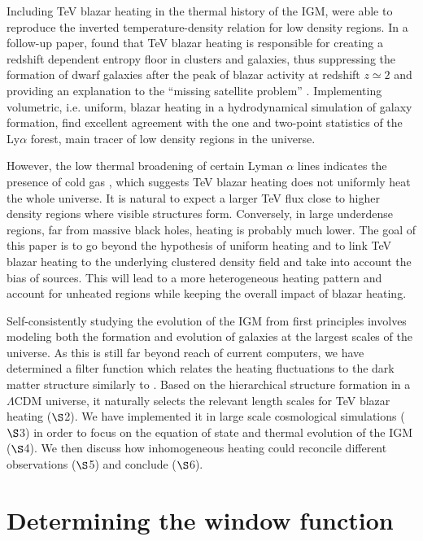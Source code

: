 \documentclass[twocolumns]{emulateapj}
\begin{document}
Including TeV blazar heating in the thermal history of the IGM, \citet{2012ApJ...752...23C} were able to reproduce the inverted temperature-density relation for low density regions. In a follow-up paper, \citet{2012ApJ...752...24P} found that TeV blazar heating is responsible for creating  a redshift dependent entropy floor in clusters and galaxies, thus suppressing the formation of dwarf galaxies after the peak of blazar activity at redshift $z\simeq2$ and providing an explanation to the ``missing satellite problem'' \citep{2010AdAst2010E...8K}. Implementing volumetric, i.e. uniform, blazar heating in a hydrodynamical simulation of galaxy formation, \citet{2012MNRAS.423..149P} find excellent agreement with the one and two-point statistics of the Ly$\alpha$ forest, main tracer of low density regions in the universe.

However, the low thermal broadening of certain Lyman $\alpha$ lines indicates the presence of cold gas \citep{2012ApJ...757L..30R}, which suggests TeV blazar heating does not uniformly heat the whole universe.  It is natural to expect a larger TeV flux close to higher density regions where visible structures form. Conversely, in large underdense regions, far from massive black holes, heating is probably much lower. The goal of this paper is to go beyond the hypothesis of uniform heating and to link TeV blazar heating to the underlying clustered density field and take into account the bias of sources. This will lead to a more heterogeneous heating pattern and account for unheated regions while keeping the overall impact of blazar heating.


Self-consistently studying the evolution of the IGM from first principles involves modeling both the formation and evolution of galaxies  at the largest scales of the universe. As this is still far beyond reach of current computers, we have determined a filter function which relates the heating fluctuations to the dark matter structure similarly to \citet{2007MNRAS.376.1680P,2005ApJ...626....1B,2014PhRvD..89h3010P}. Based on the hierarchical structure formation in a $\Lambda$CDM universe, it naturally selects the relevant length scales for TeV blazar heating ($\S$2). We have implemented it in large scale cosmological simulations ($\S$3) in order to  focus on the equation of state and thermal evolution of the  IGM ($\S$4). We then discuss how inhomogeneous heating could reconcile different observations ($\S$5)  and conclude ($\S$6).



\section {Determining the window function}\label{window}
\end{document}

